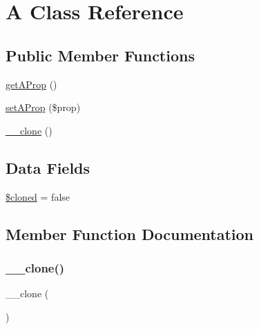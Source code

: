 \hypertarget{class_deep_copy_1_1f006_1_1_a}{}\section{A Class Reference}
\label{class_deep_copy_1_1f006_1_1_a}
\subsection*{Public Member Functions}
\begin{DoxyCompactItemize}
\item 
\mbox{\hyperlink{class_deep_copy_1_1f006_1_1_a_a3c232655009a5149eda2aee9223b98c8}{get\+A\+Prop}} ()
\item 
\mbox{\hyperlink{class_deep_copy_1_1f006_1_1_a_a703a721755190f59400a474c3e8cd8da}{set\+A\+Prop}} (\$prop)
\item 
\mbox{\hyperlink{class_deep_copy_1_1f006_1_1_a_ad0cb87b388bc74d63dc884accdca8713}{\+\_\+\+\_\+clone}} ()
\end{DoxyCompactItemize}
\subsection*{Data Fields}
\begin{DoxyCompactItemize}
\item 
\mbox{\hyperlink{class_deep_copy_1_1f006_1_1_a_adde823dfad7d62fbfb51f60b16dcb8d6}{\$cloned}} = false
\end{DoxyCompactItemize}


\subsection{Member Function Documentation}
\mbox{\label{class_deep_copy_1_1f006_1_1_a_ad0cb87b388bc74d63dc884accdca8713}} 
\subsubsection{\texorpdfstring{\+\_\+\+\_\+clone()}{\_\_clone()}}
{\footnotesize\ttfamily \+\_\+\+\_\+clone (\begin{DoxyParamCaption}{ }\end{DoxyParamCaption})}

\mbox{\label{class_deep_copy_1_1f006_1_1_a_a3c232655009a5149eda2aee9223b98c8}} 
